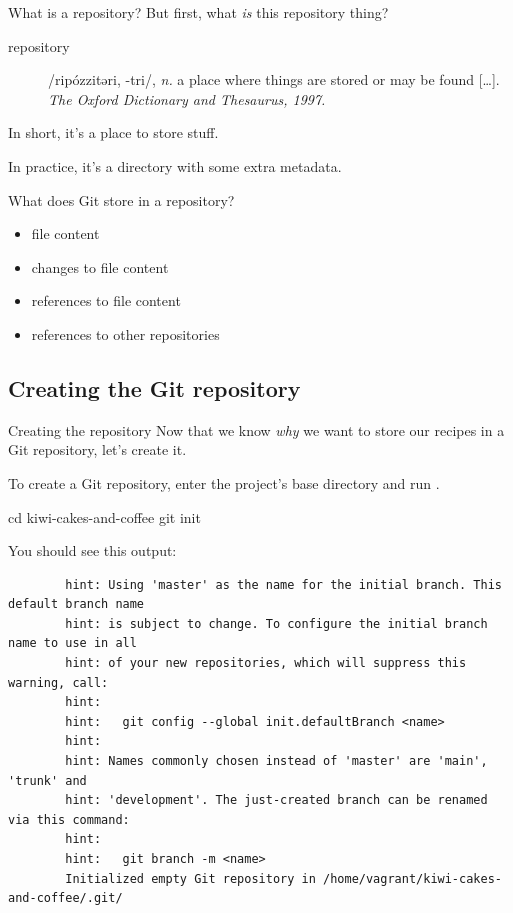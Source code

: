 \documentclass{git_course}
\begin{document}
\begin{frame}{What is a repository?}
    But first, what \emph{is} this repository thing?

    \begin{description}
        \item[repository] /ripózzitəri, -tri/, \emph{n.} a place where
            things are stored or may be found [\ldots].
            \emph{The Oxford Dictionary and Thesaurus, 1997.}
    \end{description}

    In short, it's a place to store stuff.

    In practice, it's a directory with some extra metadata.

    What does Git store in a repository?
    \begin{itemize}
        \item file content
        \item changes to file content
        \item references to file content
        \item references to other repositories
    \end{itemize}
\end{frame}

\subsection{Creating the Git repository}

\begin{frame}[fragile]{Creating the repository}
    Now that we know \emph{why} we want to store our recipes in a Git
    repository, let's create it.

    To create a Git repository, enter the project's base directory and run
    .

    \begin{shellcode}
        cd kiwi-cakes-and-coffee
        git init
    \end{shellcode}

    You should see this output:
    \begin{verbatim}
        hint: Using 'master' as the name for the initial branch. This default branch name
        hint: is subject to change. To configure the initial branch name to use in all
        hint: of your new repositories, which will suppress this warning, call:
        hint:
        hint:   git config --global init.defaultBranch <name>
        hint:
        hint: Names commonly chosen instead of 'master' are 'main', 'trunk' and
        hint: 'development'. The just-created branch can be renamed via this command:
        hint:
        hint:   git branch -m <name>
        Initialized empty Git repository in /home/vagrant/kiwi-cakes-and-coffee/.git/
    \end{verbatim}
\end{frame}
\end{document}
